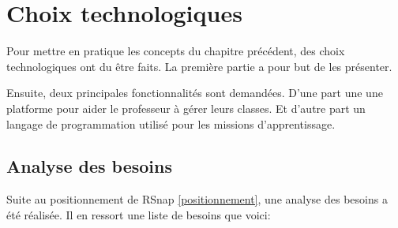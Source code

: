\section{Choix technologiques} %
Pour mettre en pratique les concepts du chapitre précédent, des choix technologiques ont du être faits. La première partie a pour but de les présenter.

Ensuite, deux principales fonctionnalités sont demandées. %
D'une part une une platforme pour aider le professeur à gérer leurs classes. Et d'autre part un langage de programmation utilisé pour les missions d'apprentissage. 




\subsection{Analyse des besoins} %
Suite au positionnement de RSnap \ref{positionnement}, une analyse des besoins a été réalisée. Il en ressort une liste de besoins que voici:



